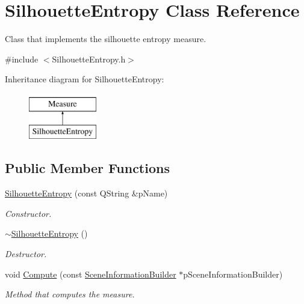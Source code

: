 \hypertarget{class_silhouette_entropy}{\section{Silhouette\+Entropy Class Reference}
\label{class_silhouette_entropy}
}


Class that implements the silhouette entropy measure.  




{\ttfamily \#include $<$Silhouette\+Entropy.\+h$>$}

Inheritance diagram for Silhouette\+Entropy\+:\begin{figure}[H]
\begin{center}
\leavevmode
\includegraphics[height=2.000000cm]{class_silhouette_entropy}
\end{center}
\end{figure}
\subsection*{Public Member Functions}
\begin{DoxyCompactItemize}
\item 
\hyperlink{class_silhouette_entropy_a05f1e64e30fc46a0b45694520bad5b13}{Silhouette\+Entropy} (const Q\+String \&p\+Name)
\begin{DoxyCompactList}\small\item\em Constructor. \end{DoxyCompactList}\item 
\hyperlink{class_silhouette_entropy_ad7d5eac516a8d63a220c421e3d8f6b4d}{$\sim$\+Silhouette\+Entropy} ()
\begin{DoxyCompactList}\small\item\em Destructor. \end{DoxyCompactList}\item 
void \hyperlink{class_silhouette_entropy_af26105e1c41d46bb3991d14ba75489dc}{Compute} (const \hyperlink{class_scene_information_builder}{Scene\+Information\+Builder} $\ast$p\+Scene\+Information\+Builder)
\begin{DoxyCompactList}\small\item\em Method that computes the measure. \end{DoxyCompactList}\end{DoxyCompactItemize}
